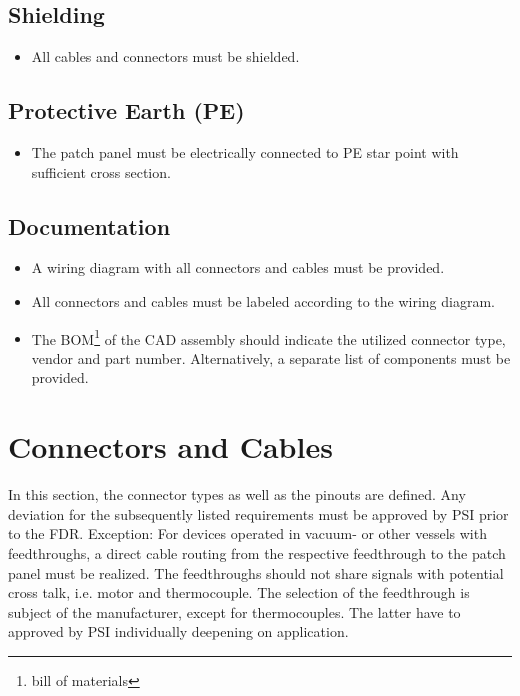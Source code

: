 \documentclass[english]{psi_easy}
\begin{document}
\subsection{Shielding}
\begin{itemize}
    \item All cables and connectors must be shielded.
\end{itemize}

\subsection{Protective Earth (PE)}
\begin{itemize}
    \item The patch panel must be electrically connected to PE star point with sufficient cross section.
\end{itemize}

\subsection{Documentation}
\begin{itemize}
    \item A wiring diagram with all connectors and cables must be provided.
    \item All connectors and cables must be labeled according to the wiring diagram.
    \item The BOM\footnote{bill of materials} of the CAD assembly should indicate the utilized connector type, vendor and part number. Alternatively, a separate list of components must be provided.
\end{itemize}

\section{Connectors and Cables}

In this section, the connector types as well as the pinouts are defined.
Any deviation for the subsequently listed requirements must be approved by PSI prior to the FDR.
Exception: For devices operated in vacuum- or other vessels with feedthroughs, a direct cable routing from the respective feedthrough to the patch panel must be realized.
The feedthroughs should not share signals with potential cross talk, i.e. motor and thermocouple.
The selection of the feedthrough is subject of the manufacturer, except for thermocouples.
The latter have to approved by PSI individually deepening on application.
\end{document}
